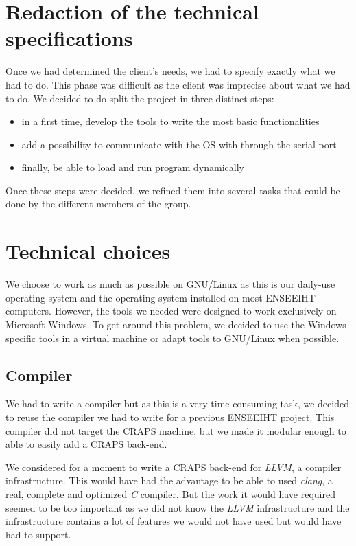 \documentclass[openany, a4paper]{book}
\begin{document}
    \section{Redaction of the technical specifications}
      Once we had determined the client's needs, we had to specify exactly what
      we had to do. This phase was difficult as the client was imprecise about
      what we had to do. We decided to do split the project in three distinct
      steps:
      \begin{itemize}
        \item in a first time, develop the tools to write the  most basic
            functionalities
        \item add a possibility to communicate with the OS with through the
            serial port
        \item finally, be able to load and run program dynamically
      \end{itemize}
      Once these steps were decided, we refined them into several tasks that
      could be done by the different members of the group.
 
    \section{Technical choices}
      We choose to work as much as possible on GNU/Linux as this is our
      daily-use operating system and the operating system installed on most
      ENSEEIHT computers.
      However, the tools we needed were designed to work exclusively on
      Microsoft Windows. To get around this problem, we decided to use the
      Windows-specific tools in a virtual machine or adapt tools to GNU/Linux
      when possible.

      \subsection{Compiler}
        We had to write a compiler but as this is a very time-consuming task, we
        decided to reuse the compiler we had to write for a previous ENSEEIHT
        project. This compiler did not target the CRAPS machine, but we made it
        modular enough to able to easily add a CRAPS back-end.

        We considered for a moment to write a CRAPS back-end for \emph{LLVM}, a
        compiler infrastructure\cite{llvm}. This would have had the advantage to
        be able to used \emph{clang}, a real, complete and optimized
        \emph{C} compiler. But the work it would have required seemed to be too
        important as we did not know the \emph{LLVM} infrastructure and the
        infrastructure contains a lot of features we would not have used but
        would have had to support.
\end{document}
